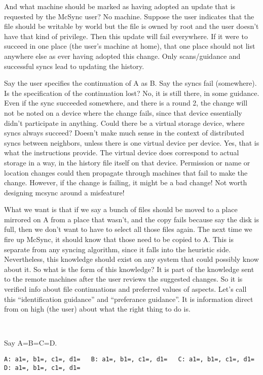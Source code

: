 \documentclass{book}
\begin{document}
And what machine should be marked as having adopted an update that is requested by the McSync user?  No machine.  Suppose the user indicates that the file should be writable by world but the file is owned by root and the user doesn't have that kind of privilege.  Then this update will fail everywhere.  If it were to succeed in one place (the user's machine at home), that one place should not list anywhere else as ever having adopted this change.  Only scans/guidance and successful syncs lead to updating the history.

Say the user specifies the continuation of A as B.  Say the syncs fail (somewhere).  Is the specification of the continuation lost?  No, it is still there, in some guidance.  Even if the sync succeeded somewhere, and there is a round 2, the change will not be noted on a device where the change fails, since that device essentially didn't participate in anything.  Could there be a virtual storage device, where syncs always succeed?  Doesn't make much sense in the context of distributed syncs between neighbors, unless there is one virtual device per device.  Yes, that is what the instructions provide.  The virtual device does correspond to actual storage in a way, in the history file itself on that device.  Permission or name or location changes could then propagate through machines that fail to make the change.  However, if the change is failing, it might be a bad change!  Not worth designing mcsync around a misfeature!

What we want is that if we say a bunch of files should be moved to a place mirrored on A from a place that wasn't, and the copy fails because say the disk is full, then we don't want to have to select all those files again.  The next time we fire up McSync, it should know that those need to be copied to A.  This is separate from any syncing algorithm, since it falls into the heuristic side.  Nevertheless, this knowledge should exist on any system that could possibly know about it.  So what is the form of this knowledge?  It is part of the knowledge sent to the remote machines after the user reviews the suggested changes.  So it is verified info about file continuations and preferred values of aspects.  Let's call this ``identification guidance'' and ``preferance guidance''.  It is information direct from on high (the user) about what the right thing to do is.

~

Say A=B=C=D.

\verb+A: a1=, b1=, c1=, d1=   B: a1=, b1=, c1=, d1=   C: a1=, b1=, c1=, d1=   D: a1=, b1=, c1=, d1=+
\end{document}
